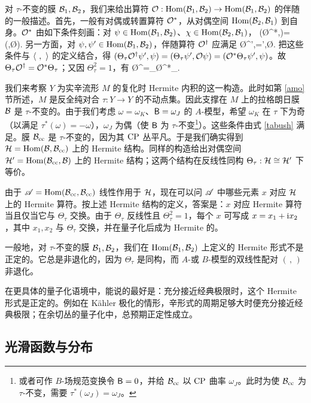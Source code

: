 对 $\tau$-不变的膜 ${\mathcal B}_1,{\mathcal B}_2$，我们来给出算符 ${\mathcal O}:{\mathrm{Hom}}({\mathcal B}_1,{\mathcal B}_2)\to{\mathrm{Hom}}({\mathcal B}_1,{\mathcal B}_2)$ 的伴随的一般描述。首先，一般有对偶或转置算符 ${\mathcal O}^*$，从对偶空间 ${\mathrm{Hom}}({\mathcal B}_2,{\mathcal B}_1)$ 到自身。${\mathcal O}^*$ 由如下条件刻画：对 $\psi\in{\mathrm{Hom}}({\mathcal B}_1,{\mathcal B}_2)$、$\chi\in{\mathrm{Hom}}({\mathcal B}_2,{\mathcal B}_1)$，
\be\label{chardual}(\O^*\chi,\psi)=(\chi,\O\psi).\ee
另一方面，对 $\psi,\psi'\in{\mathrm{Hom}}({\mathcal B}_1,{\mathcal B}_2)$，伴随算符 ${\mathcal O}^\dagger$ 应满足
\be\label{addual}\la\O^\dagger\psi',\psi\ra=\la\psi',\O\psi\ra.\ee
把这些条件与 $\langle~,~\rangle$ 的定义结合，得 $(\Theta_\tau{\mathcal O}^\dagger\psi',\psi)=(\Theta_\tau\psi',{\mathcal O}\psi)=({\mathcal O}^*\Theta_\tau\psi',\psi)$。故 $\Theta_\tau{\mathcal O}^\dagger={\mathcal O}^*\Theta_\tau$；又因 $\Theta_\tau^2=1$，有
\be\label{adjform}\O^\dagger=\Theta_\tau\O^*\Theta_\tau.\ee

我们来考察 $Y$ 为实辛流形 $M$ 的复化时 Hermite 内积的这一构造。此时如第 \ref{amo} 节所述，$M$ 是反全纯对合 $\tau:Y\to Y$ 的不动点集。因此支撑在 $M$ 上的拉格朗日膜 ${\mathcal B}$ 是 $\tau$-不变的。由于我们考虑 $\omega=\omega_K$、${\sf B}=\omega_J$ 的 $A$-模型，希望 $\omega_K$ 在 $\tau$ 下为奇（以满足 $\tau^*(\omega)=-\omega$），$\omega_J$ 为偶（使 ${\sf B}$ 为 $\tau$-不变\footnote{或者可作 $B$-场规范变换令 ${\sf B}=0$，并给 ${\mathcal B}_{\mathrm{cc}}$ 以 ${\mathrm{CP}}$ 曲率 $\omega_J$。此时为使 ${\mathcal B}_{\mathrm{cc}}$ 为 $\tau$-不变，需要 $\tau^*(\omega_J)=\omega_J$。}）。这些条件由式 \eqref{tabush} 满足。膜 ${\mathcal B}_{\mathrm{cc}}$ 是 $\tau$-不变的，因为其 ${\mathrm{CP}}$ 丛平凡。于是我们确实得到 ${\mathcal H}={\mathrm{Hom}}({\mathcal B},{\mathcal B}_{\mathrm{cc}})$ 上的 Hermite 结构。同样的构造给出对偶空间 ${\mathcal H}'={\mathrm{Hom}}({\mathcal B}_{\mathrm{cc}},{\mathcal B})$ 上的 Hermite 结构；这两个结构在反线性同构 $\Theta_\tau:{\mathcal H}\cong{\mathcal H}'$ 下等价。

由于 ${\mathscr A}={\mathrm{Hom}}({\mathcal B}_{\mathrm{cc}},{\mathcal B}_{\mathrm{cc}})$ 线性作用于 ${\mathcal H}$，现在可以问 ${\mathscr A}$ 中哪些元素 $x$ 对应 ${\mathcal H}$ 上的 Hermite 算符。按上述 Hermite 结构的定义，答案是：$x$ 对应 Hermite 算符当且仅当它与 $\Theta_\tau$ 交换。由于 $\Theta_\tau$ 反线性且 $\Theta_\tau^2=1$，每个 $x$ 可写成 $x=x_1+{\mathrm i} x_2$，其中 $x_1,x_2$ 与 $\Theta_\tau$ 交换，并在量子化后成为 Hermite 的。

一般地，对 $\tau$-不变的膜 ${\mathcal B}_1,{\mathcal B}_2$，我们在 ${\mathrm{Hom}}({\mathcal B}_1,{\mathcal B}_2)$ 上定义的 Hermite 形式不是正定的。它总是非退化的，因为 $\Theta_\tau$ 是同构，而 $A$-或 $B$-模型的双线性配对 $(\,,\,)$ 非退化。

在更具体的量子化语境中，能说的最好是：充分接近经典极限时，这个 Hermite 形式是正定的。例如在 Kähler 极化的情形，辛形式的周期足够大时便充分接近经典极限；在余切丛的量子化中，总预期正定性成立。

\subsection{光滑函数与分布}\label{smooth}

